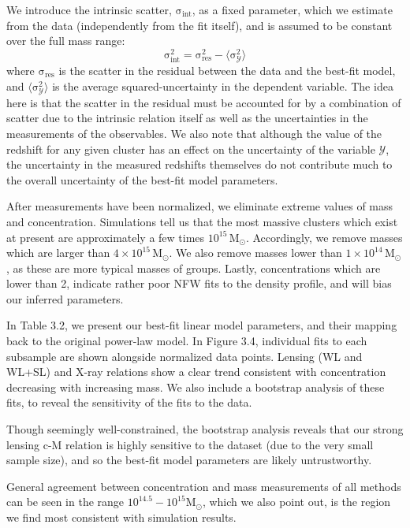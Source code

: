 We introduce the intrinsic scatter, $\mathrm{\sigma_{int}}$, as a fixed parameter,
which we estimate from the data (independently from the fit
itself), and is assumed to be constant over the full mass range:
\begin{equation}
\mathrm{\sigma_{int}^{2} = \sigma_{res}^{2} - \langle \sigma_{\mathcal{Y}}^{2} \rangle}
\end{equation}
where $\mathrm{\sigma_{res}}$ is the scatter in the residual between the data and the
best-fit model, and $\mathrm{\langle \sigma_{\mathcal{Y}}^{2} \rangle}$ is the
average squared-uncertainty in the dependent variable. The idea here is that the
scatter in the residual must be accounted for by a combination of scatter due
to the intrinsic relation itself as well as the uncertainties in the
measurements of the observables. We also note that although the value of the
redshift for any given cluster has an effect on the uncertainty of the variable
$\mathrm{\mathcal{Y}}$, the uncertainty in the measured redshifts themselves do
not contribute much to the overall uncertainty of the best-fit model parameters.
 
After measurements have been normalized, we eliminate extreme values of mass
and concentration. Simulations tell us that the most massive clusters which
exist at present are approximately a few times $\mathrm{10^{15} \,
  M_{\odot}}$. Accordingly, we remove masses which are larger than
$\mathrm{4\times 10^{15}\,M_{\odot}}$. We also remove masses lower than
$\mathrm{1\times 10^{14}\, M_{\odot}}$, as these are more typical masses of
groups. Lastly, concentrations which are lower than 2, indicate rather poor NFW
fits to the density profile, and will bias our inferred parameters.

In Table 3.2, we present our best-fit linear model parameters, and their mapping
back to the original power-law model. In Figure 3.4, individual fits
to each subsample are shown alongside normalized data points. Lensing (WL
and WL+SL) and X-ray relations show a clear trend consistent with concentration
decreasing with increasing mass. We also include a bootstrap analysis of
these fits, to reveal the sensitivity of the fits to the data. 

Though seemingly well-constrained, the bootstrap analysis reveals that our
strong lensing c-M relation is highly sensitive to the dataset (due to the very
small sample size), and so the best-fit model parameters are likely
untrustworthy.

General agreement between concentration and mass measurements of all methods
can be seen in the range $\mathrm{10^{14.5}-10^{15} M_{\odot}}$, which we also point
out, is the region we find most consistent with simulation results.

